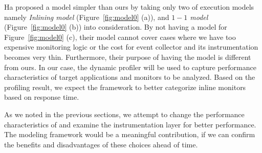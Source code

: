 Ha \etal\cite{cab:oopsala2009} proposed a model simpler than ours by taking
only two of execution models namely {\it Inlining model}
(Figure~\ref{fig:model0} (a)), and {\it $1-1$ model} (Figure~\ref{fig:model0}
(b)) into consideration. By not having a model for Figure~\ref{fig:model0} (c),
their model cannot cover cases where we have too expensive monitoring logic or
the cost for event collector and its instrumentation becomes very thin.
Furthermore, their purpose of having the model is different from ours. In our
case, the dynamic profiler will be used to capture performance characteristics
of target applications and monitors to be analyzed. Based on the profiling result,
we expect the framework to better categorize inline monitors based on
response time.

As we noted in the previous sections, we attempt to change the performance
characteristics of \sreplica and examine the instrumentation layer for better
performance. The modeling framework would be a meaningful contribution, if we
can confirm the benefits and disadvantages of these choices ahead of time.
 



